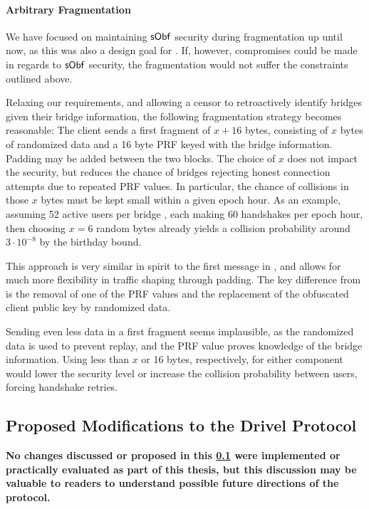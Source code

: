 \paragraph{Arbitrary Fragmentation}
We have focused on maintaining $\mathsf{sObf}$ security during fragmentation up until now, as this was also a design goal for \drivel{}.
If, however, compromises could be made in regards to $\mathsf{sObf}$ security, the fragmentation would not suffer the constraints outlined above.

Relaxing our requirements, and allowing a censor to retroactively identify bridges given their bridge information, the following fragmentation strategy becomes reasonable: The client sends a first fragment of $x+16$ bytes, consisting of $x$ bytes of randomized data and a 16 byte PRF keyed with the bridge information. Padding may be added between the two blocks. The choice of $x$ does not impact the security, but reduces the chance of bridges rejecting honest connection attempts due to repeated PRF values. In particular, the chance of collisions in those $x$ bytes must be kept small within a given epoch hour. As an example, assuming 52 active users per bridge \cite{tor-metrics}, each making 60 handshakes per epoch hour, then choosing $x=6$ random bytes already yields a collision probability around $3 \cdot 10^{-8}$ by the birthday bound.

This approach is very similar in spirit to the first message in \obfsfour{}, and allows for much more flexibility in traffic shaping through padding. The key difference from \obfsfour{} is the removal of one of the PRF values and the replacement of the obfuscated client public key by randomized data.

Sending even less data in a first fragment seems implausible, as the randomized data is used to prevent replay, and the PRF value proves knowledge of the bridge information. Using less than $x$ or 16 bytes, respectively, for either component would lower the security level or increase the collision probability between users, forcing handshake retries.

\subsection{Proposed Modifications to the Drivel Protocol} \label{ssec:drivel-mod}

\textbf{No changes discussed or proposed in this \cref{ssec:drivel-mod} were implemented or practically evaluated as part of this thesis, but this discussion may be valuable to readers to understand possible future directions of the protocol.}

